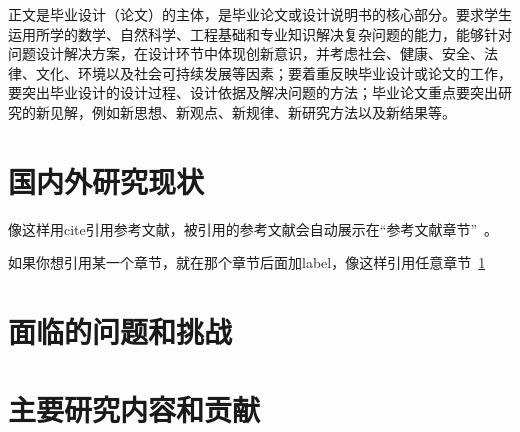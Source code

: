 \documentclass[UTF8,twoside]{ctexrep}
\begin{document}
正文是毕业设计（论文）的主体，是毕业论文或设计说明书的核心部分。要求学生运用所学的数学、自然科学、工程基础和专业知识解决复杂问题的能力，能够针对问题设计解决方案，在设计环节中体现创新意识，并考虑社会、健康、安全、法律、文化、环境以及社会可持续发展等因素；要着重反映毕业设计或论文的工作，要突出毕业设计的设计过程、设计依据及解决问题的方法；毕业论文重点要突出研究的新见解，例如新思想、新观点、新规律、新研究方法以及新结果等。


\section{国内外研究现状}\label{sec:demo_sec}
像这样用cite引用参考文献，被引用的参考文献会自动展示在“参考文献章节”~\cite{cduref_book_chen2000,cduref_book_niu2012,cduref_standard_gbt25100,cduref_book_online_lou2011,cduref_journal_desmarais1992,cduref_journal_newspaper_ding2000,cduref_newspaper_ding2000,cduref_newspaper_zhang2000,cduref_conference_china1990,cduref_conference_rosenthall1963,cduref_incollection_standard1988,cduref_incollection_han1985,cduref_incollection_lou2011,cduref_incollection_martin1966,cduref_thesis_zhang1998,cduref_thesis_calms1965,cduref_patent_liu1993,cduref_patent_hebei2001,cduref_patent_koseki2002,cduref_report_usdot1990,cduref_report_who1970,cduref_electronic_jiang1999,cduref_electronic_xiao2001,cduref_electronic_metcalf1995,cduref_electronic_turcotte1992}。

如果你想引用某一个章节，就在那个章节后面加label，像这样引用任意章节~\ref{sec:demo_sec}

\section{面临的问题和挑战}


\begin{researchlist}


\end{researchlist}

\section{主要研究内容和贡献}
\end{document}
